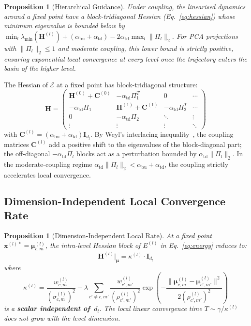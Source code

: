 \documentclass[11pt,a4paper]{article}
\newtheorem{proposition}[theorem]{Proposition}
\begin{document}
\begin{proposition}[Hierarchical Guidance]
\label{prop:guidance}
Under coupling, the linearised dynamics around a fixed point have a block-tridiagonal
Hessian (Eq.~\ref{eq:hessian}) whose minimum eigenvalue is bounded below by
$\min_l \lambda_{\min}(\mathbf{H}^{(l)}) + (\alpha_{\mathrm{bu}}+\alpha_{\mathrm{td}}) - 2\alpha_{\mathrm{td}}\max_l\|\Pi_l\|_2$.
For PCA projections with $\|\Pi_l\|_2 \le 1$ and moderate coupling, this lower bound is
strictly positive, ensuring exponential local convergence at every level once the
trajectory enters the basin of the higher level.
\end{proposition}

The Hessian of $\mathcal{E}$ at a fixed point has block-tridiagonal structure:
\begin{equation}
  \mathbf{H} = \begin{pmatrix}
    \mathbf{H}^{(0)} + \mathbf{C}^{(0)} & -\alpha_{\mathrm{td}}\Pi_1^T & 0 & \cdots \\
    -\alpha_{\mathrm{td}}\Pi_1 & \mathbf{H}^{(1)} + \mathbf{C}^{(1)} & -\alpha_{\mathrm{td}}\Pi_2^T & \cdots \\
    0 & -\alpha_{\mathrm{td}}\Pi_2 & \ddots & \vdots \\
    \vdots & \vdots & \vdots & \ddots
  \end{pmatrix}
\label{eq:hessian}
\end{equation}
with $\mathbf{C}^{(l)} = (\alpha_{\mathrm{bu}} + \alpha_{\mathrm{td}})\mathbf{I}_{d_l}$.
By Weyl's interlacing inequality~\cite{weyl1912}, the coupling matrices $\mathbf{C}^{(l)}$
add a positive shift to the eigenvalues of the block-diagonal part; the off-diagonal
$-\alpha_{\mathrm{td}}\Pi_l$ blocks act as a perturbation bounded by
$\alpha_{\mathrm{td}}\|\Pi_l\|_2$. In the moderate-coupling regime
$\alpha_{\mathrm{td}} \|\Pi_l\|_2 < \alpha_{\mathrm{bu}}+\alpha_{\mathrm{td}}$, the
coupling strictly accelerates local convergence.

\subsection{Dimension-Independent Local Convergence Rate}
\label{sec:theory:dimindep}

\begin{proposition}[Dimension-Independent Local Rate]
\label{prop:dimindep}
At a fixed point $\mathbf{x}^{(l)*} = \boldsymbol{\mu}^{(l)}_{c,m}$, the intra-level
Hessian block of $E^{(l)}$ in Eq.~\ref{eq:energy} reduces to:
\begin{equation}
  \mathbf{H}^{(l)}\big|_{\boldsymbol{\mu}} = \kappa^{(l)} \cdot \mathbf{I}_{d_l}
\end{equation}
where
\[
\kappa^{(l)} = \frac{w^{(l)}_{c,m}}{(\sigma^{(l)}_{c,m})^2}
  - \lambda \sum_{c' \ne c, m'} \frac{w^{(l)}_{c',m'}}{(\rho^{(l)}_{c',m'})^2}
    \exp\!\left(-\frac{\|\boldsymbol{\mu}^{(l)}_{c,m} - \boldsymbol{\mu}^{(l)}_{c',m'}\|^2}{2(\rho^{(l)}_{c',m'})^2}\right)
\]
is a \textbf{scalar independent of~$d_l$}. The local linear convergence time
$T \sim \gamma/\kappa^{(l)}$ does not grow with the level dimension.
\end{proposition}
\end{document}
